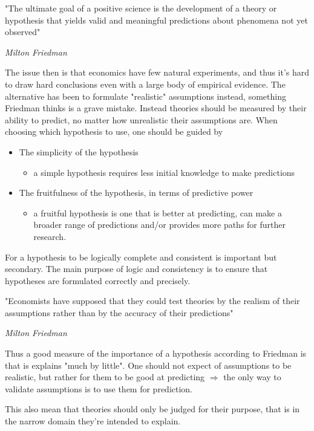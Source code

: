 \documentclass[12pt, a4paper]{article}
\begin{document}
\begin{multicols}{2}
\epigraph{"The ultimate goal of a positive science is the development of a theory or hypothesis that yields valid and meaningful predictions about phenomena not yet observed"}{\textit{Milton Friedman}}
The issue then is that economics have few natural experiments, and thus it's hard to draw hard conclusions even with a large body of empirical evidence. The alternative has been to formulate "realistic" assumptions instead, something Friedman thinks is a grave mistake. Instead theories should be measured by their ability to predict, no matter how unrealistic their assumptions are. When choosing which hypothesis to use, one should be guided by 
\begin{itemize}
\item The simplicity of the hypothesis
\begin{itemize}
\item a simple hypothesis requires less initial knowledge to make predictions
\end{itemize}
\item The fruitfulness of the hypothesis, in terms of predictive power
\begin{itemize}
\item a fruitful hypothesis is one that is better at predicting, can make a broader range of predictions and/or provides more paths for further research.
\end{itemize}
\end{itemize}
For a hypothesis to be logically complete and consistent is important but secondary. The main purpose of logic and consistency is to ensure that hypotheses are formulated correctly and precisely.
\epigraph{"Economists have supposed that they could test theories by the realism of their assumptions rather than by the accuracy of their predictions"}{\textit{Milton Friedman}}
Thus a good measure of the importance of a hypothesis according to Friedman is that is explains "much by little". One should not expect of assumptions to be realistic, but rather for them to be good at predicting $\Rightarrow$ the only way to validate assumptions is to use them for prediction. 


This also mean that theories should only be judged for their purpose, that is in the narrow domain they're intended to explain.


\end{multicols}
\end{document}
